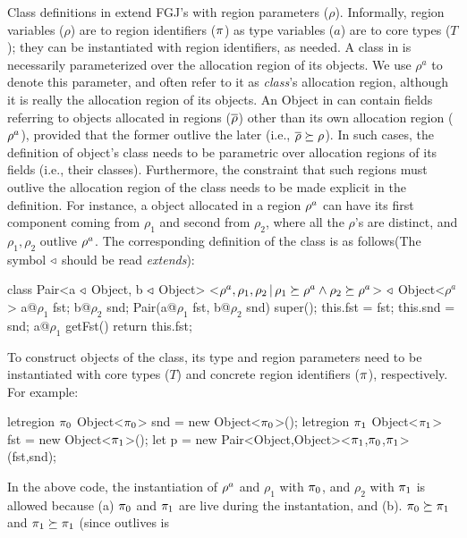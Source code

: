 Class definitions in \FB extend FGJ's with region parameters
($\rho$). Informally, region variables ($\rho$) are to region
identifiers ($\pi$) as type variables ($a$) are to core types ($T$);
they can be instantiated with region identifiers, as needed. A class
in \FB is necessarily parameterized over the allocation region of its
objects. We use $\rho^a$ to denote this parameter, and often refer to
it as \emph{class}'s allocation region, although it is really the
allocation region of its objects. An Object in \FB can contain fields
referring to objects allocated in regions ($\overline{\rho}$) other than its
own allocation region ($\rho^a$), provided that the former outlive
the later (i.e., $\overline{\rho} \succeq \rho$). In such cases, the
definition of object's class needs to be parametric over allocation
regions of its fields (i.e., their classes). Furthermore, the
constraint that such regions must outlive the allocation region of the
class needs to be made explicit in the definition. For instance, a
 object allocated in a region ${\rho^a}$ can have its first
component coming from ${\rho_1}$ and second from $\rho_2$, where all
the $\rho$'s are distinct, and $\rho_1, \rho_2$ outlive
$\rho^a$. The corresponding definition of the  class is as
follows(The symbol $\triangleleft$ should be read \emph{extends}):  
\begin{codejava}[mathescape=true]
class Pair<a $\triangleleft$ Object, b $\triangleleft$ Object>
          <$\rho^a, \rho_1, \rho_2 \,|\, \rho_1 \succeq \rho^a \wedge \rho_2 \succeq \rho^a$> $\triangleleft$ Object<$\rho^a$>
           {
  a@$\rho_1$ fst; 
  b@$\rho_2$ snd;
  Pair(a@$\rho_1$ fst, b@$\rho_2$ snd) {
    super(); 
    this.fst = fst; 
    this.snd = snd;
  }
  a@$\rho_1$ getFst() {
    return this.fst;
  }
}
\end{codejava}
To construct objects of the  class, its type and region
parameters need to be instantiated with core types ($T$) and concrete
region identifiers ($\pi$), respectively. For example:
\begin{codejava}
letregion $\pi_0$ {
  Object<$\pi_0$> snd = new Object<$\pi_0$>();
  letregion $\pi_1$ {
    Object<$\pi_1$> fst = new Object<$\pi_1$>();
    let p = new Pair<Object,Object><$\pi_1$,$\pi_0$,$\pi_1$>
                  (fst,snd);
  }
}
\end{codejava}
In the above code, the instantiation of $\rho^a$ and $\rho_1$ with
$\pi_0$, and $\rho_2$ with $\pi_1$ is allowed because (a) $\pi_0$
and $\pi_1$ are live during the instantation, and (b). $\pi_0
\succeq \pi_1$ and $\pi_1 \succeq \pi_1$ (since outlives is
